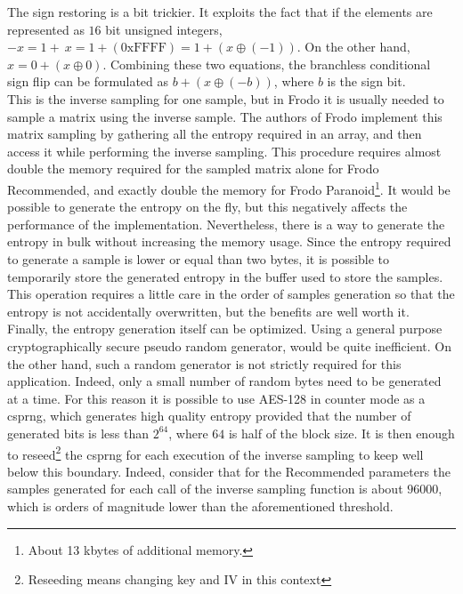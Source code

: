 The sign restoring is a bit trickier. It exploits the fact that if the elements are represented as $16$ bit unsigned integers, $-x=1+~x=1+(\text{0xFFFF})=1+(x\oplus(-1))$. On the other hand,$x=0+(x\oplus0)$. Combining these two equations, the branchless conditional sign flip can be formulated as $b+(x\oplus(-b))$, where $b$ is the sign bit.\\
This is the inverse sampling for one sample, but in Frodo it is usually needed to sample a matrix using the inverse sample. The authors of Frodo implement this matrix sampling by gathering all the entropy required in an array, and then access it while performing the inverse sampling. This procedure requires almost double the memory required for the sampled matrix alone for Frodo Recommended, and exactly double the memory for Frodo Paranoid\footnote{About 13 kbytes of additional memory.}. It would be possible to generate the entropy on the fly, but this negatively affects the performance of the implementation. Nevertheless, there is a way to generate the entropy in bulk without increasing the memory usage. Since the entropy required to generate a sample is lower or equal than two bytes, it is possible to temporarily store the generated entropy in the buffer used to store the samples. This operation requires a little care in the order of samples generation so that the entropy is not accidentally overwritten, but the benefits are well worth it.\\
Finally, the entropy generation itself can be optimized. Using a general purpose cryptographically secure pseudo random generator, would be quite inefficient. On the other hand, such a random generator is not strictly required for this application. Indeed, only a small number of random bytes need to be generated at a time. For this reason it is possible to use AES-128 in counter mode as a csprng, which generates high quality entropy provided that the number of generated bits is less than $2^{64}$, where $64$ is half of the block size. It is then enough to reseed\footnote{Reseeding means changing key and IV in this context} the csprng for each execution of the inverse sampling to keep well below this boundary. Indeed, consider that for the Recommended parameters the samples generated for each call of the inverse sampling function is about $96000$, which is orders of magnitude lower than the aforementioned threshold. 

